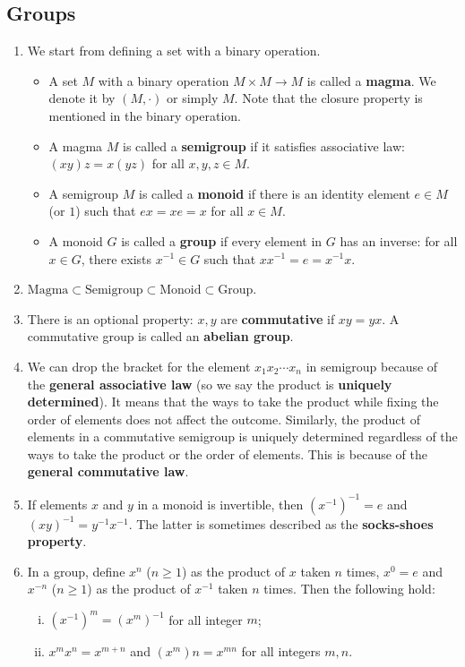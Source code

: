 \subsection*{Groups} 
\begin{enumerate}[(1)]
	\item We start from defining a set with a binary operation.
	\begin{itemize}
		\item A set $M$ with a binary operation $M\times M \rightarrow M$ is called a \textbf{magma}. We denote it by $(M,\cdot)$ or simply $M$. Note that the closure property is mentioned in the binary operation.
		\item A magma $M$ is called a \textbf{semigroup} if  it satisfies associative law: $(xy)z = x(yz)$ for all $x,y,z\in M$.
		\item A semigroup $M$ is called a \textbf{monoid} if there is an identity element $e\in M$ (or $1$) such that $ex = xe = x$ for all $x\in M$.
		\item A monoid $G$ is called a \textbf{group} if every element in $G$ has an inverse: for all $x\in G$, there exists $x^{-1}\in G$ such that $xx^{-1}  = e = x^{-1}x$.
	\end{itemize}
	\item $\text{Magma}\subset \text{Semigroup} \subset \text{Monoid} \subset \text{Group}$.
	\item There is an optional property: $x,y$ are \textbf{commutative} if $xy = yx$. A commutative group is called an \textbf{abelian group}.
	\item We can drop the bracket for the element $x_1x_2\cdots x_n$ in semigroup   because of the \textbf{general associative law} (so we say the product is \textbf{uniquely determined}). It  means that the ways to take the product while fixing the order of elements does not affect the outcome. Similarly, the product of elements in a commutative semigroup is uniquely determined regardless of the ways to take the product or the order of elements. This is because of the \textbf{general commutative law}.
	\item If elements $x$ and $y$ in a monoid is invertible,  then $(x^{-1})^{-1} = e$ and $(xy)^{-1} = y^{-1}x^{-1}$. The latter is sometimes described as the \textbf{socks-shoes property}.
	\item In a group, define $x^n$ ($n\geq 1$) as the product of $x$ taken $n$ times, $x^0 = e$ and  $x^{-n}$ ($n\geq 1$) as the product of $x^{-1}$ taken $n$ times. Then the following hold:
	\begin{enumerate}[(i)]
		\item $(x^{-1})^m = (x^m)^{-1}$ for all integer $m$;
		\item $x^mx^n = x^{m+n}$ and $(x^m)n = x^{mn}$ for all integers $m,n$.
	\end{enumerate}
\end{enumerate}